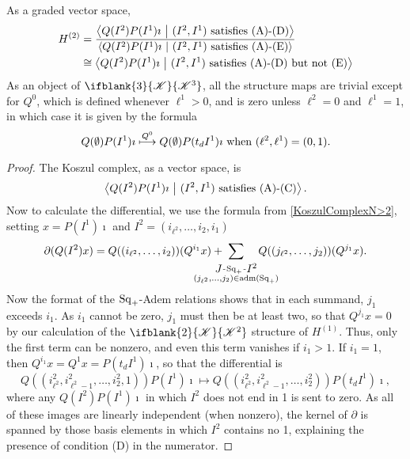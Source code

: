 \documentclass[10pt]{article}
\makeatletter
\newcommand{\LL}[1]{\ifblank{#1}{\scrK}{\scrK^{#1}}}
\newcommand{\produces}[3]{{#1}{#3}{#2}}
\newcommand{\admis}[1]{\mathrm{adm}(#1)}%
\renewcommand{\Q}{Q}
\newcommand{\SqShift}{\Sq_{\smash{+}}}
\newcommand{\Sq}{\mathrm{Sq}}
\renewcommand{\produces}[3]{
{
\def\labelstyle{\scriptstyle}
\xymatrix@C=2em@1{
{#1}
\ar@{-}[r]|-{{\,#3\,}}
&%
{#2}%
}}}
\makeatother
\begin{document}
\begin{CalculatingRepeatedKoszul}
\begin{prop}
As a graded vector space,
\begin{alignat*}{2}
H^{(2)}
&=
\frac{\left\langle \Q(I^2)P(I^1)\imath\ \middle|\  (I^2,I^1)\textup{ satisfies \textup{(A)}-\textup{(D)}}\right\rangle}{\left\langle \Q(I^2)P(I^1)\imath\ \middle|\  (I^2,I^1)\textup{ satisfies \textup{(A)}-\textup{(E)}}\right\rangle}%
\\
&\cong
{\left\langle \Q(I^2)P(I^1)\imath\ \middle|\  (I^2,I^1)\textup{ satisfies \textup{(A)}-\textup{(D)} but not \textup{(E)}}\right\rangle}%
\end{alignat*}
As an object of $\LL{3}$, all the structure maps are trivial except for $\Q^0$, which is defined whenever $\ell^1>0$, and is zero unless $\ell^2=0$ and $\ell^1=1$, in which case it is given by the formula \[\Q(\emptyset)P(I^1)\imath \overset{\Q^0}{\mapsto} \Q(\emptyset)P(t_dI^1)\imath\textup{ when $(\ell^2,\ell^1)=(0,1)$}.\]
\end{prop}
\begin{proof}
The Koszul complex, as a vector space, is \[\left\langle \Q(I^2)P(I^1)\imath\ \middle|\ (I^2,I^1)\textup{ satisfies \textup{(A)}-\textup{(C)}}\right\rangle.\] %
Now to calculate the differential, we use the formula from \ref{KoszulComplexN>2}, setting $x=P(I^1)\imath$ and $I^2=(i_{\ell^2},\ldots,i_2,i_1)$
\[\partial(\Q(I^2)x)=\Q((i_{\ell^2},\ldots,i_2))(\Q^{i_1}x)+ \!\!\!\!\!\!\!\!\!\!\!\!\!\!\!\!\!\sum_{\substack{\produces{J}{I^2}{\SqShift}\\(j_{\ell^2},\ldots,j_2)\in\admis{\SqShift}}}\!\!\!\!\!\!\!\!\!\!\!\! \Q((j_{\ell^2},\ldots,j_2))(\Q^{j_1}x).\]
Now the format of the $\SqShift$-Adem relations shows that in each summand, $j_1$ exceeds $i_1$. As $i_1$ cannot be zero, $j_1$ must then be at least two, so that $Q^{j_1}x=0$ by our calculation of the $\LL{2}$ structure of $H^{(1)}$. Thus, only the first term can be nonzero, and even this term vanishes if $i_1>1$. If $i_1=1$, then $\Q^{i_1}x=\Q^1x=P(t_dI^1)\imath$, so that the differential is
\[\Q((i^2_{\ell^2},i^2_{\ell^2-1},\ldots,i^2_{2},1))P(I^1)\imath\mapsto \Q((i^2_{\ell^2},i^2_{\ell^2-1},\ldots,i^2_{2}))P(t_dI^1)\imath,\]
where any $\Q(I^2)P(I^1)\imath$ in which $I^2$ does not end in 1 is sent to zero. As all of these images are linearly independent (when nonzero), the kernel of $\partial$ is spanned by those basis elements in which $I^2$ contains no 1, explaining the presence of condition \textup{(D)} in the numerator.


\end{proof}
\end{CalculatingRepeatedKoszul}
\end{document}
